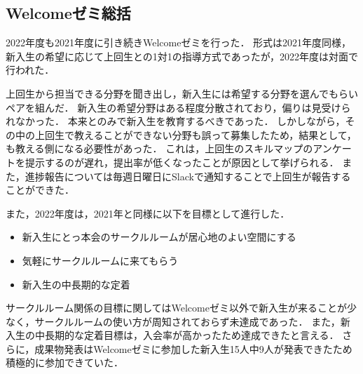 \subsection*{Welcomeゼミ総括}


2022年度も2021年度に引き続きWelcomeゼミを行った．
形式は2021年度同様，新入生の希望に応じて上回生との1対1の指導方式であったが，2022年度は対面で行われた．

上回生から担当できる分野を聞き出し，新入生には希望する分野を選んでもらいペアを組んだ．
新入生の希望分野はある程度分散されており，偏りは見受けられなかった．
本来\secondGrade{}と\thirdGrade{}のみで新入生を教育するべきであった．
しかしながら，その中の上回生で教えることができない分野も誤って募集したため，結果として，\fourthGrade{}も教える側になる必要性があった．
これは，上回生のスキルマップのアンケートを提示するのが遅れ，提出率が低くなったことが原因として挙げられる．
また，進捗報告については毎週日曜日にSlackで通知することで上回生が報告することができた．

また，2022年度は，2021年と同様に以下を目標として進行した．
\begin{itemize}
	\item 新入生にとっ本会のサークルルームが居心地のよい空間にする
	\item 気軽にサークルルームに来てもらう
	\item 新入生の中長期的な定着
\end{itemize}

サークルルーム関係の目標に関してはWelcomeゼミ以外で新入生が来ることが少なく，サークルルームの使い方が周知されておらず未達成であった．
また，新入生の中長期的な定着目標は，入会率が高かったため達成できたと言える．
さらに，成果物発表はWelcomeゼミに参加した新入生15人中9人が発表できたため積極的に参加できていた．
